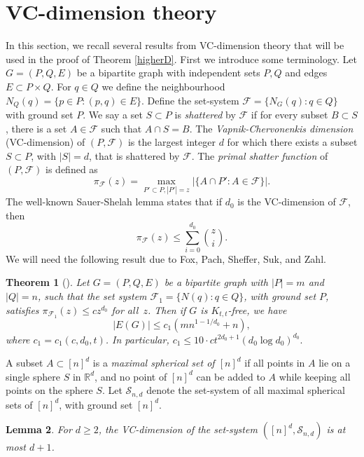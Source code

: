 \documentclass[11pt]{article}
\theoremstyle{plain}
\newtheorem{theorem}{Theorem}[section]
\newtheorem{lemma}[theorem]{Lemma}
\theoremstyle{definition}
\theoremstyle{remark}
\begin{document}
\section{VC-dimension theory}\label{secvc}
In this section, we recall several results from VC-dimension theory that will be used in the proof of Theorem \ref{higherD}.   First we introduce some terminology. 
%
%
%
%
%
Let $G = (P,Q,E)$ be a bipartite graph with independent sets $P,Q$ and edges $E \subset P \times Q$. For $q \in Q$ we define the neighbourhood $N_Q(q) = \{ p \in P \colon (p,q) \in E\}$. Define the set-system $\mathcal{F} = \{ N_G(q) \colon q \in Q\}$ with ground set $P$. We say a set $S \subset P$ is \emph{shattered} by $\mathcal{F}$ if for every subset $B \subset S$, there is a set $A \in \mathcal{F}$ such that $A \cap S = B$. The \emph{Vapnik-Chervonenkis dimension} (VC-dimension) of $(P,\mathcal{F})$ is the largest integer $d$ for which there exists a subset $S \subset P$, with $|S| = d$, that is shattered by $\mathcal{F}$. 
%
The \emph{primal shatter function} of $(P,\mathcal{F})$ is defined as
\[ \pi_{\mathcal{F}}(z) = \max_{P'\subset P, |P'| = z} | \{ A \cap P' \colon A \in \mathcal{F} \}|. \]
%
\noindent The well-known Sauer-Shelah lemma \cite{sauer,shelah} states that if $d_0$ is the VC-dimension of $\mathcal{F}$, then 
%
\begin{equation}\label{sauer} \pi_{\mathcal{F}}(z)  \leq \sum_{i=0}^{d_0} \binom{z}{i}. \end{equation}
%
%
\noindent We will need the following result due to Fox, Pach, Sheffer, Suk, and Zahl.
%
%
\begin{theorem}[\cite{fox}]\label{bipVC}
%
Let $G = (P, Q, E)$ be a bipartite graph with $|P| = m$ and $|Q| = n$, such that the set
system $\mathcal{F}_1 = \{N(q) \colon q \in Q\}$, with ground set $P$, satisfies $\pi_{\mathcal{F}_1}(z) \leq cz^{d_0}$ for all~$z$. Then if $G$ is $K_{t,t}$-free, we have 
%
\[ |E(G)| \leq c_1(mn^{1-1/d_0} + n), \]
where $c_1 = c_1(c, d_0, t)$.  In particular, $c_1 \leq 10\cdot ct^{2d_0 + 1}(d_0\log d_0)^{d_0}.$
%
\end{theorem}
%
%
%
%
A subset $A \subset [n]^d$ is a \emph{maximal spherical set of $[n]^d$} if all points in $A$ lie on a single sphere $S$ in $\mathbb{R}^d$, and no point of $[n]^d$ can be added to $A$ while keeping all points on the sphere $S$. Let $\mathcal{S}_{n,d}$ denote the set-system of all maximal spherical sets of $[n]^d$, with ground set $[n]^d$.  
%
%
\begin{lemma}\label{sphereVC}
%
For $d\geq 2$, the VC-dimension of the set-system $([n]^d,\mathcal{S}_{n,d})$ is at most $d+1$. 
%
\end{lemma}
\end{document}
